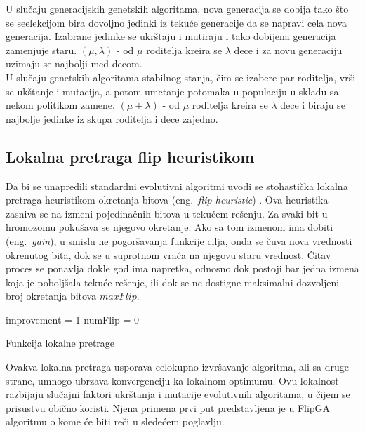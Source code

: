 \documentclass[a4paper]{article}
\begin{document}
U slučaju generacijskih genetskih algoritama, nova generacija se dobija tako što se 
seelekcijom bira dovoljno jedinki iz tekuće generacije da se napravi cela nova generacija.
Izabrane jedinke se ukrštaju i mutiraju i tako dobijena generacija zamenjuje staru.
$(\mu, \lambda)$ - od $\mu$ roditelja kreira se $\lambda$ dece i 
za novu generaciju uzimaju se najbolji međ decom.\\ 
 
U slučaju genetskih algoritama stabilnog stanja, čim se izabere par roditelja, 
vrši se ukštanje i mutacija, a potom umetanje potomaka u populaciju u 
skladu sa nekom politikom zamene. $(\mu + \lambda)$ - od $\mu$ roditelja 
kreira se $\lambda$ dece i biraju se najbolje jedinke iz skupa roditelja i dece zajedno. 


\subsection{Lokalna pretraga flip heuristikom}
\label{sec:lokalna_pretraga_flip}
Da bi se unapredili standardni evolutivni algoritmi uvodi se stohastička lokalna pretraga
heuristikom okretanja bitova (eng.~{\em flip heuristic}) \cite{MaRos99_flipGA}.
Ova heuristika zasniva se na izmeni pojedinačnih bitova u tekućem rešenju. 
Za svaki bit u hromozomu pokušava se njegovo okretanje. Ako sa tom izmenom ima dobiti 
(eng.~{\em gain}), u smislu ne pogoršavanja funkcije cilja, 
onda se čuva nova vrednosti okrenutog bita, 
dok se u suprotnom vraća na njegovu staru vrednost. 
Čitav proces se ponavlja dokle god ima napretka, odnosno dok postoji bar jedna izmena
koja je poboljšala tekuće rešenje, ili dok se ne dostigne maksimalni dozvoljeni broj
okretanja bitova $maxFlip$.\\

\begin{algorithm}[H]
\SetAlgoLined
{}

\BlankLine
 improvement = 1\;
 numFlip = 0\;
 \caption{Funkcija lokalne pretrage}
\end{algorithm}

Ovakva lokalna pretraga usporava celokupno izvršavanje algoritma, ali sa druge strane, 
umnogo ubrzava konvergenciju ka lokalnom optimumu. Ovu lokalnost razbijaju slučajni faktori
ukrštanja i mutacije evolutivnih algoritama, u čijem se prisustvu obično koristi. 
Njena primena prvi put predstavljena je u FlipGA algoritmu o kome će biti reči 
u sledećem poglavlju.
\end{document}
